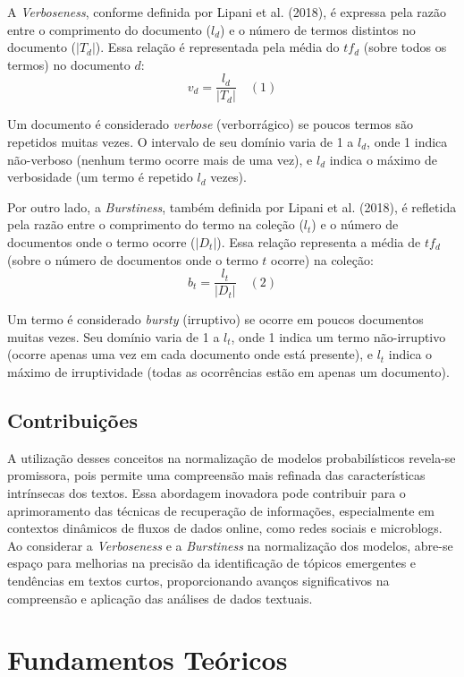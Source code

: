 \documentclass[12pt]{article}
\begin{document}
A \textit{Verboseness}, conforme definida por Lipani et al. (2018), é expressa pela razão entre o comprimento do documento (\(l_d\)) e o número de termos distintos no documento (\(|T_d|\)). Essa relação é representada pela média do \(tf_d\) (sobre todos os termos) no documento \(d\):
\[ v_d = \frac{l_d}{|T_d|} \quad (1)\]

Um documento é considerado \textit{verbose} (verborrágico) se poucos termos são repetidos muitas vezes. O intervalo de seu domínio varia de 1 a \(l_d\), onde 1 indica não-verboso (nenhum termo ocorre mais de uma vez), e \(l_d\) indica o máximo de verbosidade (um termo é repetido \(l_d\) vezes).

Por outro lado, a \textit{Burstiness}, também definida por Lipani et al. (2018), é refletida pela razão entre o comprimento do termo na coleção (\(l_t\)) e o número de documentos onde o termo ocorre (\(|D_t|\)). Essa relação representa a média de \(tf_d\) (sobre o número de documentos onde o termo \(t\) ocorre) na coleção:
\[ b_t = \frac{l_t}{|D_t|} \quad (2)\]

Um termo é considerado \textit{bursty} (irruptivo) se ocorre em poucos documentos muitas vezes. Seu domínio varia de 1 a \(l_t\), onde 1 indica um termo não-irruptivo (ocorre apenas uma vez em cada documento onde está presente), e \(l_t\) indica o máximo de irruptividade (todas as ocorrências estão em apenas um documento).

\subsection{Contribuições}
A utilização desses conceitos na normalização de modelos probabilísticos revela-se promissora, pois permite uma compreensão mais refinada das características intrínsecas dos textos. Essa abordagem inovadora pode contribuir para o aprimoramento das técnicas de recuperação de informações, especialmente em contextos dinâmicos de fluxos de dados online, como redes sociais e microblogs. Ao considerar a \textit{Verboseness} e a \textit{Burstiness} na normalização dos modelos, abre-se espaço para melhorias na precisão da identificação de tópicos emergentes e tendências em textos curtos, proporcionando avanços significativos na compreensão e aplicação das análises de dados textuais.

\section{Fundamentos Teóricos}
\end{document}
